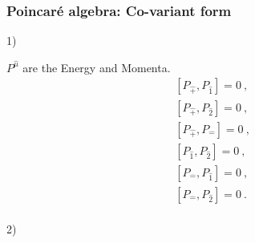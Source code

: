 \documentclass[12pt,a4paper]{report}
\begin{document}
\subsubsection{Poincaré algebra: Co-variant form}
1)

$P^{\hat{\mu}}$ are the Energy and Momenta.
\begin{align*}
    &\left[P_{\hat{+}},P_{\hat{1}}\right]=0~,\\
    &\left[P_{\hat{+}},P_{\hat{2}}\right]=0~,\\
    &\left[P_{\hat{+}},P_{\hat{-}}\right]=0~,\\
    &\left[P_{\hat{1}},P_{\hat{2}}\right]=0~,\\
    & \left[P_{\hat{-}},P_{\hat{1}}\right]=0~,\\
    &\left[P_{\hat{-}},P_{\hat{2}}\right]=0~.
\end{align*}\\
2) 
\end{document}
